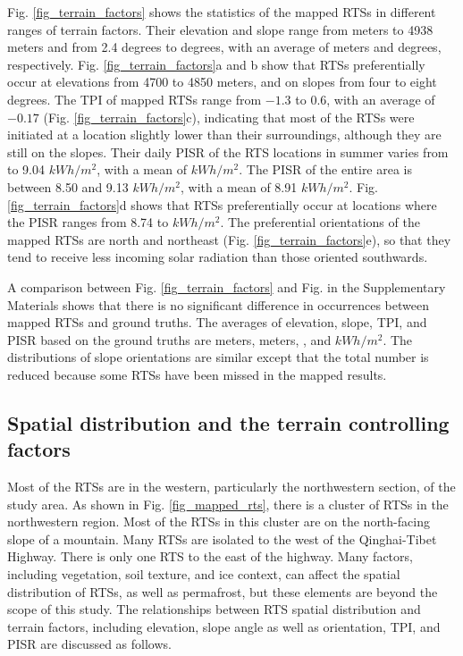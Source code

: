 \documentclass[authoryear,preprint,review,12pt]{elsarticle}
\begin{document}
Fig. \ref{fig_terrain_factors} shows the statistics of the mapped RTSs in different ranges of terrain factors. Their elevation and slope range from  meters to 4938 meters and from 2.4 degrees to  degrees, with an average of  meters and  degrees, respectively. Fig. \ref{fig_terrain_factors}a and b show that RTSs preferentially occur at elevations from 4700 to 4850 meters, and on slopes from four to eight degrees. The TPI of mapped RTSs range from $-1.3$ to 0.6, with an average of $-0.17$ (Fig. \ref{fig_terrain_factors}c), indicating that most of the RTSs were initiated at a location slightly lower than their surroundings, although they are still on the slopes.  Their daily PISR of the RTS locations in summer varies from  to 9.04 $kWh/m^2$, with a mean of  $kWh/m^2$. The PISR of the entire area is between 8.50 and 9.13 $kWh/m^2$, with a mean of 8.91 $kWh/m^2$. Fig. \ref{fig_terrain_factors}d shows that RTSs preferentially occur at locations where the PISR ranges from 8.74 to  $kWh/m^2$.
The preferential orientations of the mapped RTSs are north and northeast (Fig. \ref{fig_terrain_factors}e), so that they tend to receive less incoming solar radiation than those oriented southwards. 

A comparison between Fig. \ref{fig_terrain_factors} and Fig.  in the Supplementary Materials shows that there is no significant difference in occurrences between mapped RTSs and ground truths. The averages of elevation, slope, TPI, and PISR based on the ground truths are  meters,  meters, , and  $kWh/m^2$. The distributions of slope orientations are similar except that the total number is reduced because some RTSs have been missed in the mapped results. 

\subsection{Spatial distribution and the terrain controlling factors}
\label{subsec_rts_spatial}

Most of the RTSs are in the western, particularly the northwestern section, of the study area. As shown in Fig. \ref{fig_mapped_rts}, there is a cluster of RTSs in the northwestern region. Most of the RTSs in this cluster are on the north-facing slope of a mountain.  Many RTSs are isolated to the west of the Qinghai-Tibet Highway. There is only one RTS to the east of the highway. Many factors, including vegetation, soil texture, and ice context, can affect the spatial distribution of RTSs, as well as permafrost, but these elements are beyond the scope of this study. The relationships between RTS spatial distribution and terrain factors, including elevation, slope angle as well as orientation, TPI, and PISR are discussed as follows.
\end{document}
